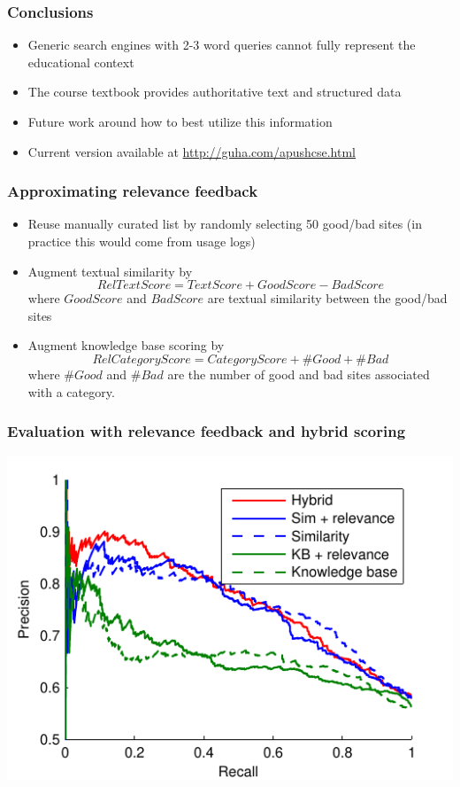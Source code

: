 \documentclass{beamer}
\begin{document}
\begin{frame}
\frametitle{Conclusions}
\begin{itemize}
\item Generic search engines with 2-3 word queries cannot fully represent the
  educational context
\item The course textbook provides authoritative text and structured data
\item Future work around how to best utilize this information
\item Current version available at \url{http://guha.com/apushcse.html}
\end{itemize}
\end{frame}

\begin{frame}
\frametitle{Approximating relevance feedback}
\begin{itemize}
\item Reuse manually curated list by randomly selecting 50 good/bad sites (in
  practice this would come from usage logs)
\item Augment textual similarity by
\begin{equation}
RelTextScore = TextScore + GoodScore - BadScore
\end{equation}
where $GoodScore$ and $BadScore$ are textual similarity between the good/bad sites
\item Augment knowledge base scoring by
\begin{equation}
RelCategoryScore = CategoryScore + \#Good + \#Bad 
\end{equation}
where $\#Good$ and $\#Bad$ are the number of good and bad sites associated with
a category.
\end{itemize}
\end{frame}

\begin{frame}
\frametitle{Evaluation with relevance feedback and hybrid scoring}
\begin{center}
\includegraphics{expt_relevance}
\end{center}
\end{frame}
\end{document}
